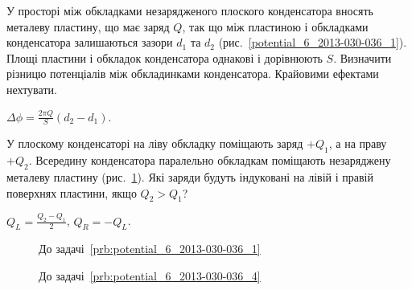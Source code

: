 \begin{problem}\label{prb:potential_6_2013-030-036_1}
    У просторі між обкладками незарядженого плоского конденсатора вносять металеву пластину, що має заряд $Q$, так що між пластиною і обкладками конденсатора залишаються зазори $d_1$ та $d_2$ (рис.~\ref{potential_6_2013-030-036_1}). Площі пластини і обкладок конденсатора однакові і дорівнюють $S$. Визначити різницю потенціалів між обкладинками конденсатора. Крайовими ефектами нехтувати.
\begin{solution}
	$\Delta\phi = \frac{2\pi Q}{S} (d_2 - d_1)$.
\end{solution}
\end{problem}



\begin{problem}\label{prb:potential_6_2013-030-036_4}
    У плоскому конденсаторі на ліву обкладку поміщають заряд $+Q_1$, а на праву $+Q_2$. Всередину конденсатора паралельно обкладкам поміщають незаряджену металеву пластину (рис.~\ref{potential_6_2013-030-036_4}). Які заряди будуть індуковані на лівій і правій поверхнях пластини, якщо $Q_2>Q_1$?
\begin{solution}
	$Q_{L} = \frac{Q_2 - Q_1}{2}$, $Q_{R} = -Q_{L}$.
\end{solution}
\end{problem}

\begin{figure}[h!]\centering
\begin{minipage}[t]{0.45\linewidth}\centering
\caption{До задачі~\ref{prb:potential_6_2013-030-036_1}}
\label{potential_6_2013-030-036_1}
\end{minipage}
\begin{minipage}[t]{0.45\linewidth}\centering
\caption{До задачі~\ref{prb:potential_6_2013-030-036_4}}
\label{potential_6_2013-030-036_4}
\end{minipage}
\end{figure}


